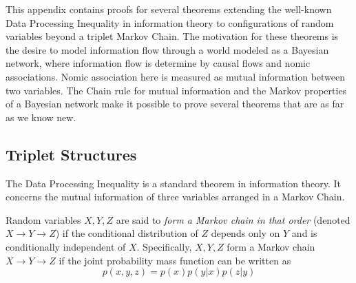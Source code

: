 \documentclass[../thesis.tex]{subfiles}
\begin{document}
This appendix contains proofs for several theorems extending
the well-known Data Processing Inequality in information theory
to configurations of random variables beyond a triplet Markov Chain.
The motivation for these theorems is the desire to model information
flow through a world modeled as a Bayesian network, where information
flow is determine by causal flows and nomic associations.
Nomic association here is measured as mutual information between two variables.
The Chain rule for mutual information and the Markov properties of
a Bayesian network make it possible to prove several theorems that are
as far as we know new.

\subsection{Triplet Structures}

The Data Processing Inequality is a standard theorem in information theory.
It concerns the mutual information of three variables arranged in a
Markov Chain.

\begin{dfn}
  Random variables $X, Y, Z$ are said to \emph{form a Markov chain in that order}
  (denoted $X \rightarrow Y \rightarrow Z$) if the conditional distribution
  of $Z$ depends only on $Y$ and is conditionally independent of $X$.
  Specifically, $X,Y,Z$ form a Markov chain $X \rightarrow Y \rightarrow Z$
  if the joint probability mass function can be written as
  \begin{equation}
    p(x,y,z) = p(x)p(y \vert x)p(z \vert y)
  \end{equation}
  \cite{cover2012elements}
\end{dfn}
\end{document}
